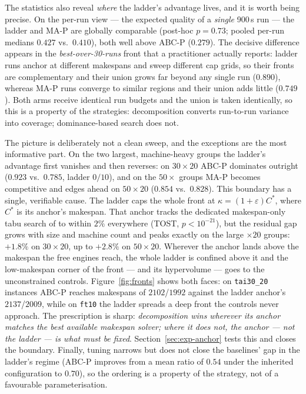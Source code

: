 \documentclass[preprint,12pt]{elsarticle}
\begin{document}
The statistics also reveal \emph{where} the ladder's advantage lives, and
it is worth being precise. On the per-run view --- the expected quality of
a \emph{single} 900\,s run --- the ladder and MA-P are globally comparable
(post-hoc $p=0.73$; pooled per-run medians $0.427$ vs.\ $0.410$), both well
above ABC-P ($0.279$). The decisive difference appears in the
\emph{best-over-30-runs} front that a practitioner actually reports: ladder
runs anchor at different makespans and sweep different cap grids, so their
fronts are complementary and their union grows far beyond any single run
($0.890$), whereas MA-P runs converge to similar regions and their union
adds little ($0.749$). Both arms receive identical run budgets and the
union is taken identically, so this is a property of the strategies:
decomposition converts run-to-run variance into coverage; dominance-based
search does not.

The picture is deliberately not a clean sweep, and the exceptions are the
most informative part. On the two largest, machine-heavy groups the ladder's
advantage first vanishes and then reverses: on $30{\times}20$ ABC-P dominates
outright ($0.923$ vs.\ $0.785$, ladder $0/10$), and on the $50{\times}$ groups
MA-P becomes competitive and edges ahead on $50{\times}20$ ($0.854$ vs.\
$0.828$). This boundary has a single, verifiable cause. The ladder caps the
whole front at $\kappa=(1+\varepsilon)C^{*}$, where $C^{*}$ is its anchor's
makespan. That anchor tracks the dedicated makespan-only tabu search of
\cite{DiazTabu2026} to within $2\%$ everywhere (TOST, $p<10^{-21}$), but the
residual gap grows with size and machine count and peaks exactly on the
large $\times 20$ groups: $+1.8\%$ on $30{\times}20$, up to $+2.8\%$ on
$50{\times}20$. Wherever the anchor lands above the makespan the free
engines reach, the whole ladder is confined above it and the low-makespan
corner of the front --- and its hypervolume --- goes to the unconstrained
controls. Figure~\ref{fig:fronts} shows both faces: on \texttt{tai30\_20}
instances ABC-P reaches makespans of $2102$/$1992$ against the ladder
anchor's $2137$/$2009$, while on \texttt{ft10} the ladder spreads a deep
front the controls never approach. The prescription is sharp:
\emph{decomposition wins wherever its anchor matches the best available
makespan solver; where it does not, the anchor --- not the ladder --- is
what must be fixed}. Section~\ref{sec:exp-anchor} tests this and closes the
boundary. Finally, tuning narrows but does not close the baselines' gap in
the ladder's regime (ABC-P improves from a mean ratio of $0.54$ under the
inherited configuration to $0.70$), so the ordering is a property of the
strategy, not of a favourable parameterisation.
\end{document}
